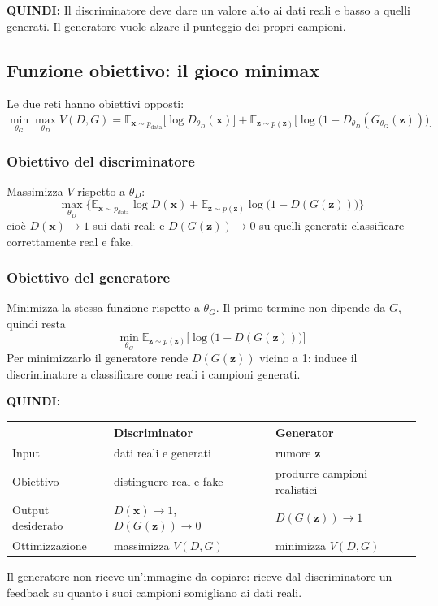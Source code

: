 \documentclass[11pt,a4paper]{article}
\providecommand{\E}{\mathbb{E}}
\begin{document}
\textbf{QUINDI:} Il discriminatore deve dare un valore alto ai dati reali e basso a quelli
generati. Il generatore vuole alzare il punteggio dei propri campioni.

\subsection{Funzione obiettivo: il gioco minimax}

Le due reti hanno obiettivi opposti:
\[
\min_{\theta_G}\max_{\theta_D}V(D,G)
=\E_{\mathbf{x}\sim p_{\mathrm{data}}}\big[\log D_{\theta_D}(\mathbf{x})\big]
+\E_{\mathbf{z}\sim p(\mathbf{z})}\big[\log\big(1-D_{\theta_D}(G_{\theta_G}(\mathbf{z}))\big)\big]
\]

\subsubsection{Obiettivo del discriminatore}
Massimizza $V$ rispetto a $\theta_D$:
\[
\max_{\theta_D}\Big\{\E_{\mathbf{x}\sim p_{\mathrm{data}}}\log D(\mathbf{x})
+\E_{\mathbf{z}\sim p(\mathbf{z})}\log\big(1-D(G(\mathbf{z}))\big)\Big\}
\]
cioè $D(\mathbf{x})\to 1$ sui dati reali e $D(G(\mathbf{z}))\to 0$ su quelli
generati: classificare correttamente real e fake.

\subsubsection{Obiettivo del generatore}
Minimizza la stessa funzione rispetto a $\theta_G$. Il primo termine non dipende
da $G$, quindi resta
\[
\boxed{\min_{\theta_G}\E_{\mathbf{z}\sim p(\mathbf{z})}\big[\log\big(1-D(G(\mathbf{z}))\big)\big]}
\]
Per minimizzarlo il generatore rende $D(G(\mathbf{z}))$ vicino a 1: induce il
discriminatore a classificare come reali i campioni generati.

\textbf{QUINDI:}
\begin{center}
\renewcommand{\arraystretch}{1.35}
\begin{tabular}{|p{2.9cm}|p{5.5cm}|p{5.5cm}|}
\hline
 & \textbf{Discriminator} & \textbf{Generator} \\
\hline
Input & dati reali e generati & rumore $\mathbf{z}$ \\
\hline
Obiettivo & distinguere real e fake & produrre campioni realistici \\
\hline
Output desiderato & $D(\mathbf{x})\to1$, $D(G(\mathbf{z}))\to0$ & $D(G(\mathbf{z}))\to1$ \\
\hline
Ottimizzazione & massimizza $V(D,G)$ & minimizza $V(D,G)$ \\
\hline
\end{tabular}
\end{center}
Il generatore non riceve un'immagine da copiare: riceve dal discriminatore un
feedback su quanto i suoi campioni somigliano ai dati reali.
\end{document}

